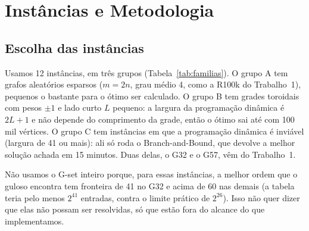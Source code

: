 \section{Instâncias e Metodologia}\label{sec:instancias}

\subsection{Escolha das instâncias}

Usamos 12 instâncias, em três grupos (Tabela~\ref{tab:familias}). O grupo A tem grafos aleatórios esparsos ($m=2n$, grau médio 4, como a R100k do Trabalho~1), pequenos o bastante para o ótimo ser calculado. O grupo B tem grades toroidais com pesos $\pm1$ e lado curto $L$ pequeno: a largura da programação dinâmica é $2L+1$ e não depende do comprimento da grade, então o ótimo sai até com 100 mil vértices. O grupo C tem instâncias em que a programação dinâmica é inviável (largura de 41 ou mais): ali só roda o Branch-and-Bound, que devolve a melhor solução achada em 15 minutos. Duas delas, o G32 e o G57, vêm do Trabalho~1.

Não usamos o G-set inteiro porque, para essas instâncias, a melhor ordem que o guloso encontra tem fronteira de 41 no G32 e acima de 60 nas demais (a tabela teria pelo menos $2^{41}$ entradas, contra o limite prático de $2^{26}$). Isso não quer dizer que elas não possam ser resolvidas, só que estão fora do alcance do que implementamos.

